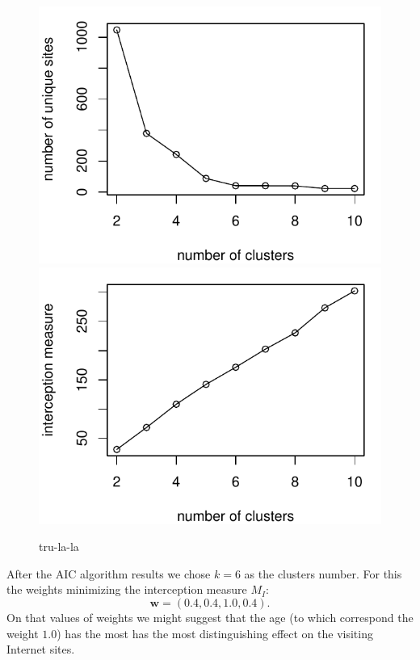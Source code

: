 \documentclass[runningheads,a4paper]{llncs}
\begin{document}
\begin{figure}\label{N7Jti}

\includegraphics[scale=0.6]{fig_uurls.pdf}\hfill
\includegraphics[scale=0.6]{fig_meas.pdf}

\caption{tru-la-la}
\end{figure}

After the AIC algorithm results we chose $k=6$ as the clusters number. For this the weights minimizing the interception measure $M_I$:
\[
	\boldsymbol{w} = (0.4, 0.4, 1.0, 0.4).
\]
On that values of weights we might suggest that the age (to which correspond the weight $1.0$) has the most has the most distinguishing effect on the visiting Internet sites.
\end{document}
